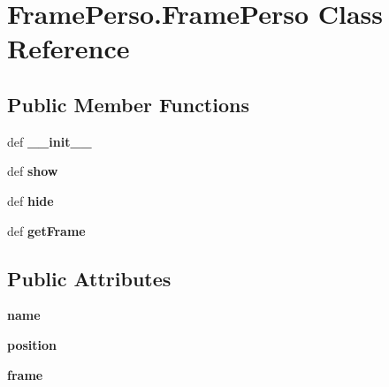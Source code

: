 \hypertarget{classFramePerso_1_1FramePerso}{\section{Frame\+Perso.\+Frame\+Perso Class Reference}
\label{classFramePerso_1_1FramePerso}
}
\subsection*{Public Member Functions}
\begin{DoxyCompactItemize}
\item 
\hypertarget{classFramePerso_1_1FramePerso_abea90e125f725878b582758fc6598248}{def {\bfseries \+\_\+\+\_\+init\+\_\+\+\_\+}}\label{classFramePerso_1_1FramePerso_abea90e125f725878b582758fc6598248}

\item 
\hypertarget{classFramePerso_1_1FramePerso_aefa50176848dcc8831ed70697ee07d97}{def {\bfseries show}}\label{classFramePerso_1_1FramePerso_aefa50176848dcc8831ed70697ee07d97}

\item 
\hypertarget{classFramePerso_1_1FramePerso_a9799f39004ccec3e417474862b6063e4}{def {\bfseries hide}}\label{classFramePerso_1_1FramePerso_a9799f39004ccec3e417474862b6063e4}

\item 
\hypertarget{classFramePerso_1_1FramePerso_acb78b6f6fc21c34535fa360ae8870230}{def {\bfseries get\+Frame}}\label{classFramePerso_1_1FramePerso_acb78b6f6fc21c34535fa360ae8870230}

\end{DoxyCompactItemize}
\subsection*{Public Attributes}
\begin{DoxyCompactItemize}
\item 
\hypertarget{classFramePerso_1_1FramePerso_acb7723cd36bdd7e594a487f708fcf694}{{\bfseries name}}\label{classFramePerso_1_1FramePerso_acb7723cd36bdd7e594a487f708fcf694}

\item 
\hypertarget{classFramePerso_1_1FramePerso_aadb477d2f0c575012fb05f3a04752549}{{\bfseries position}}\label{classFramePerso_1_1FramePerso_aadb477d2f0c575012fb05f3a04752549}

\item 
\hypertarget{classFramePerso_1_1FramePerso_a40e5813706a75974b64e5a095fd455ef}{{\bfseries frame}}\label{classFramePerso_1_1FramePerso_a40e5813706a75974b64e5a095fd455ef}

\end{DoxyCompactItemize}


